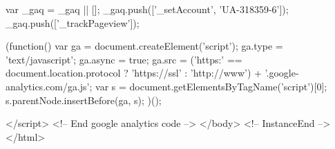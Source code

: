           var _gaq = _gaq || [];
          _gaq.push(['_setAccount', 'UA-318359-6']);
          _gaq.push(['_trackPageview']);
        
          (function() {
            var ga = document.createElement('script'); ga.type = 'text/javascript'; ga.async = true;
            ga.src = ('https:' == document.location.protocol ? 'https://ssl' : 'http://www') + '.google-analytics.com/ga.js';
            var s = document.getElementsByTagName('script')[0]; s.parentNode.insertBefore(ga, s);
          })();
        
        </script>
    <!-- End google analytics code -->
  </body>
<!-- InstanceEnd --></html>
